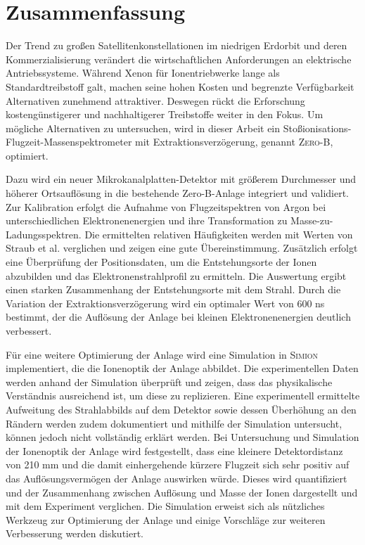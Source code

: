 \chapter*{Zusammenfassung}
Der Trend zu großen Satellitenkonstellationen im niedrigen Erdorbit und deren Kommerzialisierung verändert die wirtschaftlichen Anforderungen an elektrische Antriebssysteme. Während Xenon für Ionentriebwerke lange als Standardtreibstoff galt, machen seine hohen Kosten und begrenzte Verfügbarkeit Alternativen zunehmend attraktiver. Deswegen rückt die Erforschung kostengünstigerer und nachhaltigerer Treibstoffe weiter in den Fokus. Um mögliche Alternativen zu untersuchen, wird in dieser Arbeit ein Stoßionisations-Flugzeit-Massenspektrometer mit Extraktionsverzögerung, genannt \textsc{Zero-B}, optimiert. 

Dazu wird ein neuer Mikrokanalplatten-Detektor mit größerem Durchmesser und höherer Ortsauflösung in die bestehende Zero-B-Anlage integriert und validiert. Zur Kalibration erfolgt die Aufnahme von Flugzeitspektren von Argon bei unterschiedlichen Elektronenenergien und ihre Transformation zu Masse-zu-Ladungsspektren. Die ermittelten relativen Häufigkeiten werden mit Werten von Straub et al. \cite{Straub} verglichen und zeigen eine gute Übereinstimmung. Zusätzlich erfolgt eine Überprüfung der Positionsdaten, um die Entstehungsorte der Ionen abzubilden und das Elektronenstrahlprofil zu ermitteln. Die Auswertung ergibt einen starken Zusammenhang der Entstehungsorte mit dem Strahl. Durch die Variation der Extraktionsverzögerung wird ein optimaler Wert von 600 ns bestimmt, der die Auflösung der Anlage bei kleinen Elektronenenergien deutlich verbessert.

Für eine weitere Optimierung der Anlage wird eine Simulation in \textsc{Simion} implementiert, die die Ionenoptik der Anlage abbildet. Die experimentellen Daten werden anhand der Simulation überprüft und zeigen, dass das physikalische Verständnis ausreichend ist, um diese zu replizieren. Eine experimentell ermittelte Aufweitung des Strahlabbilds auf dem Detektor sowie dessen Überhöhung an den Rändern werden zudem dokumentiert und mithilfe der Simulation untersucht, können jedoch nicht vollständig erklärt werden. Bei Untersuchung und Simulation der Ionenoptik der Anlage wird festgestellt, dass eine kleinere Detektordistanz von 210 mm und die damit einhergehende kürzere Flugzeit sich sehr positiv auf das Auflösungsvermögen der Anlage auswirken würde. Dieses wird quantifiziert und der Zusammenhang zwischen Auflösung und Masse der Ionen dargestellt und mit dem Experiment verglichen. Die Simulation erweist sich als nützliches Werkzeug zur Optimierung der Anlage und einige Vorschläge zur weiteren Verbesserung werden diskutiert.


